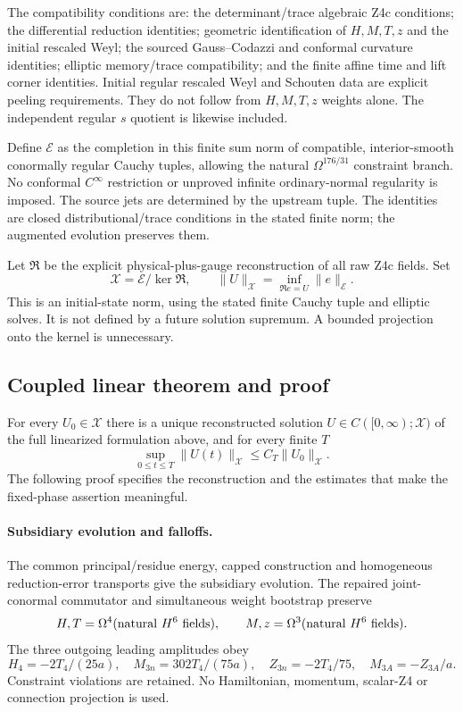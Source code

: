 The compatibility conditions are: the determinant/trace algebraic Z4c
conditions; the differential reduction identities; geometric identification
of $H,M,T,z$ and the initial rescaled Weyl; the sourced Gauss--Codazzi and
conformal curvature identities; elliptic memory/trace compatibility;
and the finite affine time and lift corner identities.
Initial regular rescaled Weyl and Schouten data are explicit peeling
requirements. They do not follow from $H,M,T,z$ weights alone.
The independent regular $s$ quotient is likewise included.

Define $\mathcal E$ as the completion in this finite sum norm of compatible,
interior-smooth conormally regular Cauchy tuples, allowing the natural
$\Omega^{176/31}$ constraint branch. No conformal $C^\infty$ restriction
or unproved infinite ordinary-normal regularity is imposed.
The source jets are determined by the upstream tuple.
The identities are closed distributional/trace conditions in the stated
finite norm; the augmented evolution preserves them.

Let $\mathfrak R$ be the explicit physical-plus-gauge reconstruction of
all raw Z4c fields. Set
\[
 \boxed{
 \mathcal X=\mathcal E/\ker\mathfrak R,\qquad
 \|U\|_{\mathcal X}=
   \inf_{\mathfrak Re=U}\|e\|_{\mathcal E}.
 }
\]
This is an initial-state norm, using the stated finite Cauchy tuple and
elliptic solves. It is not defined by a future solution supremum.
A bounded projection onto the kernel is unnecessary.

\subsection{Coupled linear theorem and proof}
For every $U_0\in\mathcal X$ there is a unique reconstructed solution
$U\in C([0,\infty);\mathcal X)$ of the full linearized formulation above,
and for every finite $T$
\[
\boxed{
 \sup_{0\leq t\leq T}\|U(t)\|_{\mathcal X}
 \leq C_T\|U_0\|_{\mathcal X}.
}
\]
The following proof specifies the reconstruction and the estimates that
make the fixed-phase assertion meaningful.

\paragraph{Subsidiary evolution and falloffs.}
The common principal/residue energy, capped construction and homogeneous
reduction-error transports give the subsidiary evolution.
The repaired joint-conormal commutator and simultaneous weight bootstrap
preserve
\[
 H,T=\Omega^4(\hbox{natural }H^6\hbox{ fields}),\qquad
 M,z=\Omega^3(\hbox{natural }H^6\hbox{ fields}).
\]
The three outgoing leading amplitudes obey
\[
 H_4=-2T_4/(25a),\quad
 M_{3n}=302T_4/(75a),\quad
 Z_{3n}=-2T_4/75,\quad M_{3A}=-Z_{3A}/a.
\]
Constraint violations are retained. No Hamiltonian, momentum, scalar-Z4
or connection projection is used.

